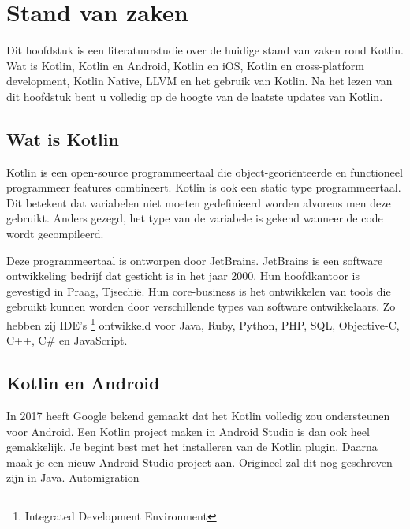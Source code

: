 \chapter{Stand van zaken}
\label{ch:stand-van-zaken}



Dit hoofdstuk is een literatuurstudie over de huidige stand van zaken rond Kotlin. Wat is Kotlin, Kotlin en Android, Kotlin en iOS, Kotlin en cross-platform development, Kotlin Native, LLVM en het gebruik van Kotlin. Na het lezen van dit hoofdstuk bent u volledig op de hoogte van de laatste updates van Kotlin.

\section{Wat is Kotlin}
\label{sec:kotlin}
Kotlin is een open-source programmeertaal die object-georiënteerde en functioneel programmeer features combineert. Kotlin is ook een static type programmeertaal. Dit betekent dat variabelen niet moeten gedefinieerd worden alvorens men deze gebruikt. Anders gezegd, het type van de variabele is gekend wanneer de code wordt gecompileerd.

Deze programmeertaal is ontworpen door JetBrains. JetBrains is een software ontwikkeling bedrijf dat gesticht is in het jaar 2000. Hun hoofdkantoor is gevestigd in Praag, Tjsechië. Hun core-business is het ontwikkelen van tools die gebruikt kunnen worden door verschillende types van software ontwikkelaars. Zo hebben zij IDE's \footnote{Integrated Development Environment} ontwikkeld voor Java, Ruby, Python, PHP, SQL, Objective-C, C++, C\# en JavaScript.

\section{Kotlin en Android}
\label{sec:kotlinandroid}
In 2017 heeft Google bekend gemaakt dat het Kotlin volledig zou ondersteunen voor Android. Een Kotlin project maken in Android Studio is dan ook heel gemakkelijk. Je begint best met het installeren van de Kotlin plugin. Daarna maak je een nieuw Android Studio project aan. Origineel zal dit nog geschreven zijn in Java. 
Automigration


